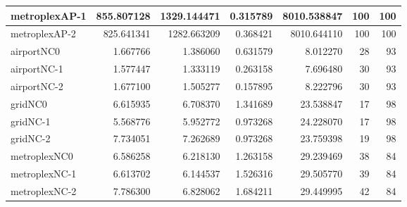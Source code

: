 \documentclass[../../../thesis.tex]{subfiles}
\begin{document}
\begin{longtable}{|l|r|r|r|r|r|r|}
metroplexAP-1 & 855.807128 & 1329.144471 & 0.315789 & 8010.538847 & 100 & 100 \\ \hline
metroplexAP-2 & 825.641341 & 1282.663209 & 0.368421 & 8010.644110 & 100 & 100 \\ \hline
airportNC0 & 1.667766 & 1.386060 & 0.631579 & 8.012270 & 28 & 93 \\ \hline
airportNC-1 & 1.577447 & 1.333119 & 0.263158 & 7.696480 & 30 & 93 \\ \hline
airportNC-2 & 1.677100 & 1.505277 & 0.157895 & 8.222796 & 30 & 93 \\ \hline
gridNC0 & 6.615935 & 6.708370 & 1.341689 & 23.538847 & 17 & 98 \\ \hline
gridNC-1 & 5.568776 & 5.952772 & 0.973268 & 24.228070 & 17 & 98 \\ \hline
gridNC-2 & 7.734051 & 7.262689 & 0.973268 & 23.759398 & 19 & 98 \\ \hline
metroplexNC0 & 6.586258 & 6.218130 & 1.263158 & 29.239469 & 38 & 84 \\ \hline
metroplexNC-1 & 6.613702 & 6.144537 & 1.526316 & 29.505770 & 39 & 84 \\ \hline
metroplexNC-2 & 7.786300 & 6.828062 & 1.684211 & 29.449995 & 42 & 84 \\ \hline
\end{longtable}
\end{document}
